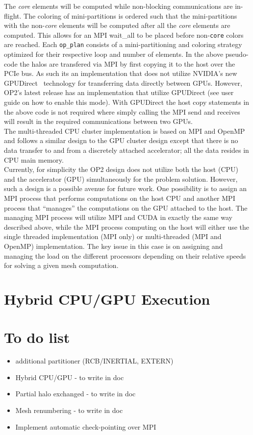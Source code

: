 \documentclass[11pt]{article}
\begin{document}
The \textit{core} elements will be computed while non-blocking communications are in-flight. The coloring of
mini-partitions is ordered such that the mini-partitions with the non-\textit{core} elements will be computed after all
the \textit{core} elements are computed. This allows for an MPI wait\_all to be placed before non-\texttt{core} colors
are reached. Each \texttt{op\_plan} consists of a mini-partitioning and coloring strategy optimized for their respective
loop and number of elements. In the above pseudo-code the halos are transfered via MPI by first copying it to the host
over the PCIe bus. As such its an implementation that does not utilize NVIDIA's new GPUDirect~\cite{gpudirect}
technology for transferring data directly between GPUs. However, OP2's latest release has an implementation that utilize
GPUDirect (see user guide on how to enable this mode). With GPUDirect the host copy statements in the above code is not
required where simply calling the MPI send and receives will result in the required communications between two GPUs.\\

\noindent The multi-threaded CPU cluster implementation is based on MPI and OpenMP and follows a similar design to the
GPU cluster design except that there is no data transfer to and from a discretely attached accelerator; all the data
resides in CPU main memory.\\

\noindent Currently, for simplicity the OP2 design does not utilize both the host (CPU) and the accelerator (GPU)
simultaneously for the problem solution. However, such a design is a possible avenue for future work. One possibility is
to assign an MPI process that performs computations on the host CPU and another MPI process that ``manages'' the
computations on the GPU attached to the host. The managing MPI process will utilize MPI and CUDA in exactly the same way
described above, while the MPI process computing on the host will either use the single threaded implementation (MPI
only) or multi-threaded (MPI and OpenMP) implementation. The key issue in this case is on assigning and managing the
load on the different processors depending on their relative speeds for solving a given mesh computation.

\section{Hybrid CPU/GPU Execution}\label{sec/hybrid}

\section{To do list}
\begin{itemize}
\item additional partitioner (RCB/INERTIAL, EXTERN)
\item Hybrid CPU/GPU - to write in doc
\item Partial halo exchanged - to write in doc
\item Mesh renumbering - to write in doc
\item Implement automatic check-pointing over MPI
\end{itemize}
\end{document}
